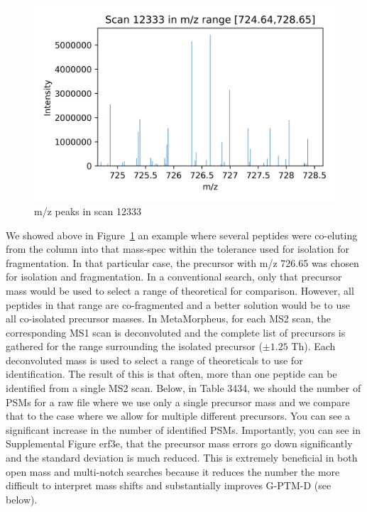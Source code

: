\documentclass[journal=jprobs,manuscript=article]{achemso}
\begin{document}
\begin{figure}[H]
\includegraphics{fig5-coIsolationSpectrum.png}
\caption{m/z peaks in scan 12333}
\label{fig:fig5-coIsolationSpectrum}
\end{figure}

We showed above in Figure~\ref{fig:fig5-coIsolationSpectrum} an example where several peptides were co-eluting from the column into that mass-spec within the tolerance used for isolation for fragmentation.
In that particular case, the precursor with m/z 726.65 was chosen for isolation and fragmentation.
In a conventional search, only that precursor mass would be used to select a range of theoretical for comparison.
However, all peptides in that range are co-fragmented and a better solution would be to use all co-isolated precursor masses.
In MetaMorpheus, for each MS2 scan, the corresponding MS1 scan is deconvoluted and the complete list of precursors is gathered for the range surrounding the isolated precursor ($\pm 1.25$ Th).
Each deconvoluted mass is used to select a range of theoreticals to use for identification.
The result of this is that often, more than one peptide can be identified from a single MS2 scan.
Below, in Table 3434, we should the number of PSMs for a raw file where we use only a single precursor mass and we compare that to the case where we allow for multiple different precursors.
You can see a significant increase in the number of identified PSMs.
Importantly, you can see in Supplemental Figure erf3e, that the precursor mass errors go down significantly and the standard deviation is much reduced.
This is extremely beneficial in both open mass and multi-notch searches because it reduces the number the more difficult to interpret mass shifts and substantially improves G-PTM-D (see below).
\end{document}

